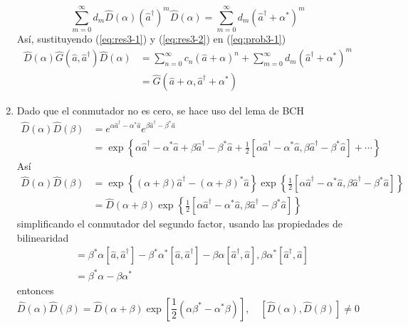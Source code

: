 \begin{enumerate}
        \begin{equation}
          \sum_{m=0}^{\infty} d_m \hat{D}(\alpha) (\hat{a}^{\dagger})^{m} \hat{D}(\alpha) = \sum_{m=0}^{\infty} d_m \left( \hat{a}^{\dagger} + \alpha^{*} \right)^{m}\label{eq:res3-2}
        \end{equation}
        Así, sustituyendo (\ref{eq:res3-1}) y (\ref{eq:res3-2}) en (\ref{eq:prob3-1})
        \begin{align*}
          \hat{D}(\alpha)\hat{G}(\hat{a}, \hat{a}^{\dagger})\hat{D}(\alpha) & = \sum_{n=0}^{\infty} c_n (\hat{a} + \alpha)^{n} + \sum_{m=0}^{\infty} d_m \left( \hat{a}^{\dagger} + \alpha^{*} \right)^{m} \\
                                                                            & = \hat{G}(\hat{a}+\alpha, \hat{a}^{\dagger} + \alpha^{*})
        \end{align*}
  \item Dado que el conmutador no es cero, se hace uso del lema de BCH
        \begin{align*}
          \hat{D}(\alpha)\hat{D}(\beta) & = e^{\alpha\hat{a}^{\dagger} - \alpha^{*}\hat{a}}e^{\beta \hat{a}^{\dagger} - \beta^{*}\hat{a}}                                                                                                                              \\
                                        & = \exp{\left\{ \alpha\hat{a}^{\dagger} -\alpha^{*}\hat{a} + \beta\hat{a}^{\dagger} - \beta^{*}\hat{a} + \frac{1}{2}[\alpha\hat{a}^{\dagger} -\alpha^{*}\hat{a},\beta\hat{a}^{\dagger} - \beta^{*}\hat{a}] + \cdots \right\}}
        \end{align*}
        Así
        \begin{align*}
          \hat{D}(\alpha)\hat{D}(\beta) & = \exp{\left\{ (\alpha+\beta)\hat{a}^{\dagger} - (\alpha+\beta)^{*}\hat{a} \right\}}\exp{\left\{ \frac{1}{2}[\alpha\hat{a}^{\dagger} -\alpha^{*}\hat{a},\beta\hat{a}^{\dagger} - \beta^{*}\hat{a}] \right\}} \\
                                        & = \hat{D}(\alpha + \beta)\exp{\left\{ \frac{1}{2}[\alpha\hat{a}^{\dagger} -\alpha^{*}\hat{a},\beta\hat{a}^{\dagger} - \beta^{*}\hat{a}] \right\}}
        \end{align*}
        simplificando el conmutador del segundo factor, usando las propiedades de bilinearidad
        \begin{align*}
          [\alpha\hat{a}^{\dagger} -\alpha^{*}\hat{a},\beta\hat{a}^{\dagger} - \beta^{*}\hat{a}] & = \beta^{*}\alpha[\hat{a}, \hat{a}^{\dagger}] - \beta^{*}\alpha^{*}[\hat{a}, \hat{a}^{\dagger}] - \beta\alpha[\hat{a}^{\dagger}, \hat{a}], \beta\alpha^*[\hat{a}^{\dagger},\hat{a}] \\
                                                                                                 & =\beta^{*}\alpha - \beta\alpha^{*}
        \end{align*}
        entonces
        \begin{equation*}
          \hat{D}(\alpha)\hat{D}(\beta) = \hat{D}(\alpha + \beta) \exp{\left[ \frac{1}{2}(\alpha\beta^* - \alpha^*\beta) \right]}, \quad [\hat{D}(\alpha), \hat{D}(\beta)]\neq 0
        \end{equation*}


\end{enumerate}
